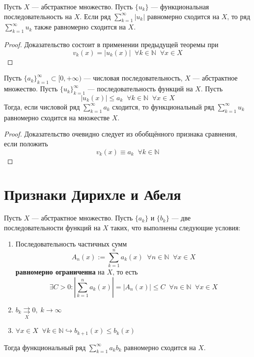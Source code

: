 \documentclass[11pt]{article}
\begin{document}
\begin{consequence}
    Пусть $X$ --- абстрактное множество. Пусть $\{u_k\}$ --- функциональная последовательность на $X$. Если ряд $\displaystyle \sum_{k = 1}^{\infty} \left\lvert u_k \right\rvert$ равномерно сходится на $X$, то ряд $\displaystyle \sum_{k = 1}^{\infty} u_k$ также равномерно сходится на $X$.
\end{consequence}

\begin{proof}
    Доказательство состоит в применении предыдущей теоремы при 
    \[v_k (x) = \left\lvert u_k (x) \right\rvert \; \; \forall k \in \mathbb{N} \; \; \forall x \in X\]
\end{proof}

\begin{theorem}
    Пусть $\{a_k\}_{k = 1}^{\infty} \subset [0, +\infty)$ --- числовая последовательность, $X$ --- абстрактное множество. Пусть $\{u_k\}_{k = 1}^{\infty}$ --- последовательность функций на $X$. Пусть 
    \[\left\lvert u_k (x) \right\rvert \leq a_k \; \; \forall k \in \mathbb{N} \; \; \forall x \in X\]
    Тогда, если числовой ряд $\displaystyle \sum_{k = 1}^{\infty} a_k$ сходится, то функциональный ряд $\displaystyle \sum_{k = 1}^{\infty} u_k$ равномерно сходится на множестве $X$.
\end{theorem}

\begin{proof}
    Доказательство очевидно следует из обобщённого признака сравнения, если положить 
    \[v_k (x) \equiv a_k \; \; \forall k \in \mathbb{N}\]
\end{proof}

\section{Признаки Дирихле и Абеля}

\begin{theorem}
    Пусть $X$ --- абстрактное множество. Пусть $\{a_k\}$ и $\{b_k\}$ --- две последовательности функций на $X$ таких, что выполнены следующие условия:
    \begin{enumerate}
        \item Последовательность частичных сумм 
        \[A_n (x) := \sum_{k = 1}^{n} a_k (x) \; \; \forall n \in \mathbb{N} \; \; \forall x \in X\]
        \textbf{равномерно ограниченна} на $X$, то есть
        \[\exists C > 0: \left\lvert \sum_{k = 1}^n a_k (x) \right\rvert = \left\lvert A_n (x) \right\rvert \leq C \; \; \forall n \in \mathbb{N} \; \; \forall x \in X \]
        \item $b_k \underset{X}{\rightrightarrows} 0, \; k \to \infty$
        \item $\forall x \in X \; \; \forall k \in \mathbb{N} \hookrightarrow b_{k + 1} (x) \leq b_k (x)$
    \end{enumerate}
    Тогда функциональный ряд $\displaystyle \sum_{k = 1}^{\infty} a_k b_k$ равномерно сходится на $X$.
\end{theorem}
\end{document}
